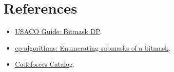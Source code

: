 \section*{References}

\begin{itemize}
  \item \href{https://usaco.guide/gold/dp-bitmasks}{USACO Guide: Bitmask DP}.
  \item \href{https://cp-algorithms.com/algebra/all-submasks.html}{cp-algorithms: Enumerating submasks of a bitmask}.
  \item \href{https://codeforces.com/catalog}{Codeforces Catalog}.
\end{itemize}
